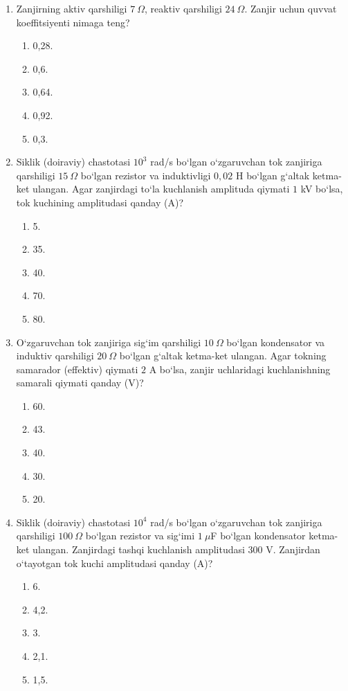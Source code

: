 \begin{enumerate}
\item Zanjirning aktiv qarshiligi $7~\Omega$, reaktiv qarshiligi $24~\Omega$. Zanjir uchun quvvat koeffitsiyenti nimaga teng?
\begin{enumerate}[label=\Alph*)]
\item 0,28.
\item 0,6.
\item 0,64.
\item 0,92.
\item 0,3.
\end{enumerate}

\item Siklik (doiraviy) chastotasi $10^3$ rad/s bo‘lgan o‘zgaruvchan tok zanjiriga qarshiligi $15~\Omega$ bo‘lgan rezistor va induktivligi $0,02$ H bo‘lgan g‘altak ketma-ket ulangan. Agar zanjirdagi to‘la kuchlanish amplituda qiymati $1$ kV bo‘lsa, tok kuchining amplitudasi qanday (A)?
\begin{enumerate}[label=\Alph*)]
\item 5.
\item 35.
\item 40.
\item 70.
\item 80.
\end{enumerate}

\item O‘zgaruvchan tok zanjiriga sig‘im qarshiligi $10~\Omega$ bo‘lgan kondensator va induktiv qarshiligi $20~\Omega$ bo‘lgan g‘altak ketma-ket ulangan. Agar tokning samarador (effektiv) qiymati $2$ A bo‘lsa, zanjir uchlaridagi kuchlanishning samarali qiymati qanday (V)?
\begin{enumerate}[label=\Alph*)]
\item 60.
\item 43.
\item 40.
\item 30.
\item 20.
\end{enumerate}

\item Siklik (doiraviy) chastotasi $10^4$ rad/s bo‘lgan o‘zgaruvchan tok zanjiriga qarshiligi $100~\Omega$ bo‘lgan rezistor va sig‘imi $1~\mu$F bo‘lgan kondensator ketma-ket ulangan. Zanjirdagi tashqi kuchlanish amplitudasi $300$ V. Zanjirdan o‘tayotgan tok kuchi amplitudasi qanday (A)?
\begin{enumerate}[label=\Alph*)]
\item 6.
\item 4,2.
\item 3.
\item 2,1.
\item 1,5.
\end{enumerate}


\end{enumerate}
